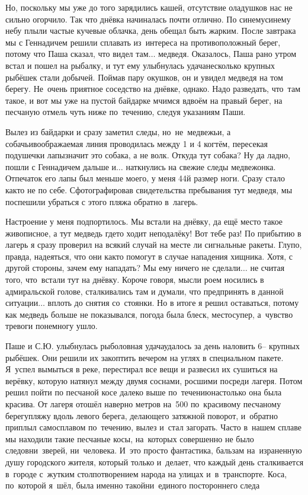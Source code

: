 Но, поскольку мы уже до того зарядились кашей, отсутствие оладушков нас не сильно огорчило. Так что днёвка начиналась почти отлично. По синему\sdash синему небу плыли частые кучевые облачка, день обещал быть жарким. После завтрака мы с Геннадичем решили сплавать из~интереса на противоположный берег, потому что Паша сказал, что видел там$\ldots$ медведя. Оказалось, Паша рано утром встал и пошел на рыбалку, и тут ему улыбнулась удача\mdash несколько крупных рыбёшек стали добычей. Поймав пару окушков, он и увидел медведя на том берегу. Не~очень приятное соседство на днёвке, однако. Надо разведать, что~там такое, и вот мы уже на пустой байдарке мчимся вдвоём на правый берег, на песчаную отмель чуть ниже по~течению, следуя указаниям Паши.

\newpage
Вылез из байдарки и сразу заметил следы, но~не~медвежьи, а собачьи\mdash воображаемая линия проводилась между 1 и 4 когтём, пересекая подушечки лапы\mdash значит это собака, а не волк. Откуда тут собака? Ну да ладно, пошли с Геннадичем дальше и$\ldots$ наткнулись на свежие следы медвежонка. Отпечаток его лапы был меньше моего, у меня 44\sdash й размер ноги. Сразу стало как\sdash то не по себе. Сфотографировав свидетельства пребывания тут медведя, мы поспешили убраться с этого пляжа обратно в~лагерь. 

Настроение у меня подпортилось. Мы встали на днёвку, да ещё место такое живописное, а тут медведь где\sdash то ходит неподалёку! Вот тебе раз! По прибытию в лагерь я сразу проверил на всякий случай на месте ли сигнальные ракеты. Глупо, правда, надеяться, что они как\sdash то помогут в случае нападения хищника. Хотя, с другой стороны, зачем ему нападать? Мы ему ничего не сделали$\ldots$ не считая того, что~встали тут на днёвку. Короче говоря, мысли роем носились в адмиральской голове, сталкивались там и думали, что предпринять в данной ситуации$\ldots$ вплоть до снятия со~стоянки. Но в итоге я решил оставаться, потому как медведь больше не показывался, погода была блеск, место\mdash супер, а~чувство тревоги понемногу ушло. 

Паше и С.Ю. улыбнулась рыболовная удача\mdash удалось за день наловить 6\thinspace\nobreakdash-- крупных рыбёшек. Они решили их закоптить вечером на углях в специальном пакете. Я~успел вымыться в реке, перестирал все вещи и развесил их сушиться на верёвку, которую натянул между двумя соснами, росшими посреди лагеря. Потом решил пойти по песчаной косе далеко выше по~течению\mdash настолько она была красива. От лагеря отошёл наверно метров на~500 по~красивому песчаному берегу\sdash пляжу вдоль левого берега, делающего затяжной поворот, и~обратно приплыл самосплавом по~течению, вылез и~стал загорать. Часто в~нашем сплаве мы находили такие песчаные косы, на~которых совершенно не было следов\mdash ни~зверей, ни~человека. И~это просто фантастика, бальзам на~израненную душу городского жителя, который только и~делает, что каждый день сталкивается в~городе с~жутким столпотворением народа на улицах и~в~транспорте. Коса, по~которой я~шёл, была именно такой\mdash ни~единого постороннего следа\mdash

